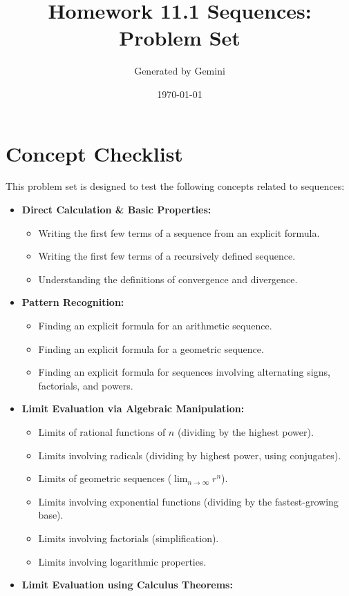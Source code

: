 \documentclass{article}
\title{Homework 11.1 Sequences: Problem Set}
\author{Generated by Gemini}
\date{\today}
\begin{document}
\maketitle

\section*{Concept Checklist}
This problem set is designed to test the following concepts related to sequences:
\begin{itemize}
    \item \textbf{Direct Calculation \& Basic Properties:}
    \begin{itemize}
        \item Writing the first few terms of a sequence from an explicit formula.
        \item Writing the first few terms of a recursively defined sequence.
        \item Understanding the definitions of convergence and divergence.
    \end{itemize}
    \item \textbf{Pattern Recognition:}
    \begin{itemize}
        \item Finding an explicit formula for an arithmetic sequence.
        \item Finding an explicit formula for a geometric sequence.
        \item Finding an explicit formula for sequences involving alternating signs, factorials, and powers.
    \end{itemize}
    \item \textbf{Limit Evaluation via Algebraic Manipulation:}
    \begin{itemize}
        \item Limits of rational functions of $n$ (dividing by the highest power).
        \item Limits involving radicals (dividing by highest power, using conjugates).
        \item Limits of geometric sequences ($\lim_{n \to \infty} r^n$).
        \item Limits involving exponential functions (dividing by the fastest-growing base).
        \item Limits involving factorials (simplification).
        \item Limits involving logarithmic properties.
    \end{itemize}
    \item \textbf{Limit Evaluation using Calculus Theorems:}

\end{itemize}
\end{document}
